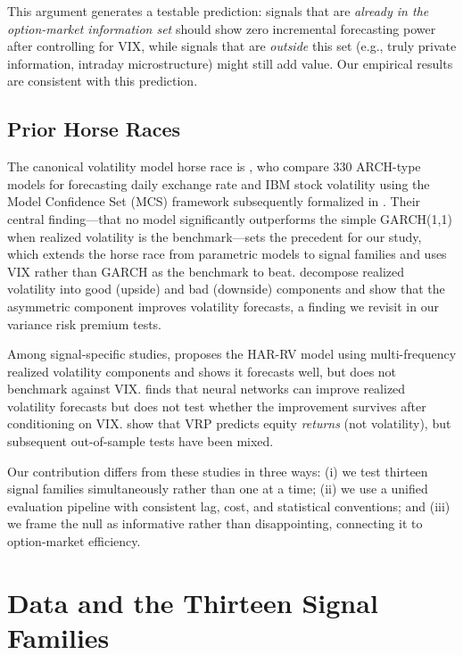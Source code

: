 \documentclass[12pt,a4paper]{article}
\begin{document}
This argument generates a testable prediction: signals that are \emph{already in the option-market information set} should show zero incremental forecasting power after controlling for VIX, while signals that are \emph{outside} this set (e.g., truly private information, intraday microstructure) might still add value. Our empirical results are consistent with this prediction.

\subsection{Prior Horse Races}

The canonical volatility model horse race is \citet{hansen2005}, who compare 330 ARCH-type models for forecasting daily exchange rate and IBM stock volatility using the Model Confidence Set (MCS) framework subsequently formalized in \citet{hansen2011mcs}. Their central finding---that no model significantly outperforms the simple GARCH(1,1) when realized volatility is the benchmark---sets the precedent for our study, which extends the horse race from parametric models to signal families and uses VIX rather than GARCH as the benchmark to beat. \citet{patton2015} decompose realized volatility into good (upside) and bad (downside) components and show that the asymmetric component improves volatility forecasts, a finding we revisit in our variance risk premium tests.

Among signal-specific studies, \citet{corsi2009} proposes the HAR-RV model using multi-frequency realized volatility components and shows it forecasts well, but does not benchmark against VIX. \citet{bucci2020} finds that neural networks can improve realized volatility forecasts but does not test whether the improvement survives after conditioning on VIX. \citet{bollerslev2009} show that VRP predicts equity \emph{returns} (not volatility), but subsequent out-of-sample tests have been mixed.

Our contribution differs from these studies in three ways: (i) we test thirteen signal families simultaneously rather than one at a time; (ii) we use a unified evaluation pipeline with consistent lag, cost, and statistical conventions; and (iii) we frame the null as informative rather than disappointing, connecting it to option-market efficiency.


\section{Data and the Thirteen Signal Families}
\label{sec:data}
\end{document}

